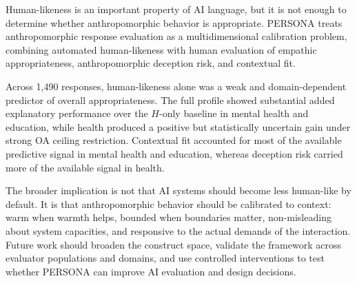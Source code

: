\documentclass[manuscript,review,anonymous]{acmart}
\begin{document}
Human-likeness is an important property of AI language, but it is not enough to determine whether anthropomorphic behavior is appropriate. PERSONA treats anthropomorphic response evaluation as a multidimensional calibration problem, combining automated human-likeness with human evaluation of empathic appropriateness, anthropomorphic deception risk, and contextual fit.

Across 1,490 responses, human-likeness alone was a weak and domain-dependent predictor of overall appropriateness. The full profile showed substantial added explanatory performance over the $H$-only baseline in mental health and education, while health produced a positive but statistically uncertain gain under strong OA ceiling restriction. Contextual fit accounted for most of the available predictive signal in mental health and education, whereas deception risk carried more of the available signal in health.

The broader implication is not that AI systems should become less human-like by default. It is that anthropomorphic behavior should be calibrated to context: warm when warmth helps, bounded when boundaries matter, non-misleading about system capacities, and responsive to the actual demands of the interaction. Future work should broaden the construct space, validate the framework across evaluator populations and domains, and use controlled interventions to test whether PERSONA can improve AI evaluation and design decisions.
\end{document}
